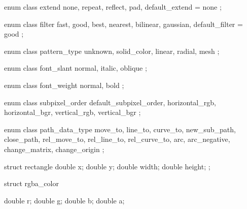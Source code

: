 \begin{codeblock}
{{{{  enum class extend {
    none,
    repeat,
    reflect,
    pad,
    default_extend = none
  };

  enum class filter {
    fast,
    good,
    best,
    nearest,
    bilinear,
    gaussian,
    default_filter = good
  };

  enum class pattern_type {
    unknown,
    solid_color,
    linear,
    radial,
    mesh
  };

  enum class font_slant {
    normal,
    italic,
    oblique
  };

  enum class font_weight {
    normal,
    bold
  };

  enum class subpixel_order {
    default_subpixel_order,
    horizontal_rgb,
    horizontal_bgr,
    vertical_rgb,
    vertical_bgr
  };

  enum class path_data_type {
    move_to,
    line_to,
    curve_to,
    new_sub_path,
    close_path,
    rel_move_to,
    rel_line_to,
    rel_curve_to,
    arc,
    arc_negative,
    change_matrix,
    change_origin
  };

  struct rectangle {
    double x;
    double y;
    double width;
    double height;
  };

  struct rgba_color {
    double r;
    double g;
    double b;
    double a;

}}}}}
\end{codeblock}
